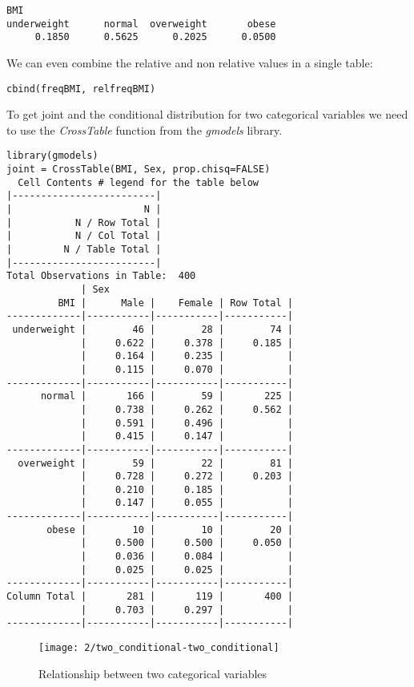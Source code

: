 \begin{verbatim}
BMI
underweight      normal  overweight       obese 
     0.1850      0.5625      0.2025      0.0500 
\end{verbatim}

We can even combine the relative and non relative values in a single table: 
\begin{verbatim}
cbind(freqBMI, relfreqBMI)
\end{verbatim}

To get joint and the conditional distribution for two categorical variables we
need to use the \emph{CrossTable} function from the \emph{gmodels} library. 

\begin{verbatim}
library(gmodels)
joint = CrossTable(BMI, Sex, prop.chisq=FALSE) 
  Cell Contents # legend for the table below
|-------------------------|
|                       N |
|           N / Row Total |
|           N / Col Total |
|         N / Table Total |
|-------------------------|
Total Observations in Table:  400  
             | Sex 
         BMI |      Male |    Female | Row Total | 
-------------|-----------|-----------|-----------|
 underweight |        46 |        28 |        74 | 
             |     0.622 |     0.378 |     0.185 | 
             |     0.164 |     0.235 |           | 
             |     0.115 |     0.070 |           | 
-------------|-----------|-----------|-----------|
      normal |       166 |        59 |       225 | 
             |     0.738 |     0.262 |     0.562 | 
             |     0.591 |     0.496 |           | 
             |     0.415 |     0.147 |           | 
-------------|-----------|-----------|-----------|
  overweight |        59 |        22 |        81 | 
             |     0.728 |     0.272 |     0.203 | 
             |     0.210 |     0.185 |           | 
             |     0.147 |     0.055 |           | 
-------------|-----------|-----------|-----------|
       obese |        10 |        10 |        20 | 
             |     0.500 |     0.500 |     0.050 | 
             |     0.036 |     0.084 |           | 
             |     0.025 |     0.025 |           | 
-------------|-----------|-----------|-----------|
Column Total |       281 |       119 |       400 | 
             |     0.703 |     0.297 |           | 
-------------|-----------|-----------|-----------|
\end{verbatim}

\begin{figure}[H]
\label{fig:two_categorical}
\caption{Relationship between two categorical variables}
\texttt{[image: 2/two\_conditional-two\_conditional]}
\end{figure}

